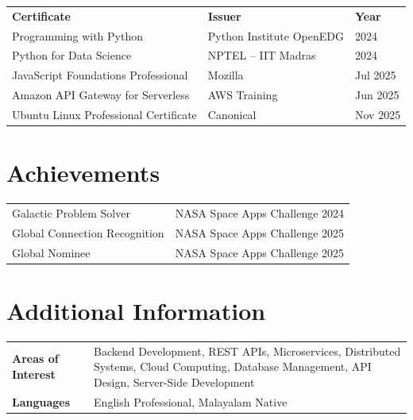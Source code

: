 \documentclass[a4paper,10pt]{article}
\begin{document}
\renewcommand{\arraystretch}{1.0}
\begin{tabular}{@{} p{7.8cm} p{6.5cm} p{2.5cm} @{}}
\textbf{Certificate}                  & \textbf{Issuer}              & \textbf{Year} \\[1pt]
Programming with Python               & Python Institute OpenEDG   & 2024 \\
Python for Data Science               & NPTEL -- IIT Madras          & 2024 \\
JavaScript Foundations Professional   & Mozilla                      & Jul 2025 \\
Amazon API Gateway for Serverless     & AWS Training                 & Jun 2025 \\
Ubuntu Linux Professional Certificate & Canonical                    & Nov 2025 \\
\end{tabular}

\section*{Achievements}

\begin{tabular}{@{} p{9.5cm} p{8cm} @{}}
Galactic Problem Solver              & NASA Space Apps Challenge 2024 \\
Global Connection Recognition        & NASA Space Apps Challenge 2025 \\
Global Nominee                       & NASA Space Apps Challenge 2025 \\
\end{tabular}

\section*{Additional Information}

\begin{tabular}{@{} >{\bfseries}p{3.8cm} p{13cm} @{}}
Areas of Interest & Backend Development, REST APIs, Microservices, Distributed Systems, Cloud Computing, Database Management, API Design, Server-Side Development \\
Languages         & English Professional, Malayalam Native \\
\end{tabular}

\vspace{3pt}
\end{document}
